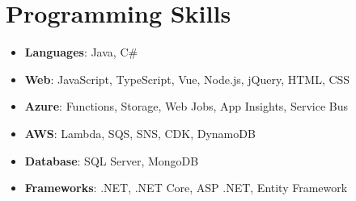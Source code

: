 \documentclass[letterpaper,11pt]{article}
\newcommand{\resumeItem}[2]{
  \item\small{
    \textbf{#1}{: #2 \vspace{-2pt}}
  }
}
\newcommand{\resumeSubItem}[2]{\resumeItem{#1}{#2}\vspace{-4pt}}
\newcommand{\resumeSubHeadingListStart}{\begin{itemize}[leftmargin=*]}
\newcommand{\resumeSubHeadingListEnd}{\end{itemize}}
\begin{document}
%
\section{Programming Skills}
  \resumeSubHeadingListStart
    \resumeSubItem{Languages}{Java, C\#}
    \resumeSubItem{Web}{JavaScript, TypeScript, Vue, Node.js, jQuery, HTML, CSS}   
    \resumeSubItem{Azure}{Functions, Storage, Web Jobs, App Insights, Service Bus}
    \resumeSubItem{AWS}{Lambda, SQS, SNS, CDK, DynamoDB}
    \resumeSubItem{Database}{SQL Server, MongoDB}
    \resumeSubItem{Frameworks}{.NET, .NET Core, ASP .NET, Entity Framework}   
\resumeSubHeadingListEnd


\end{document}
